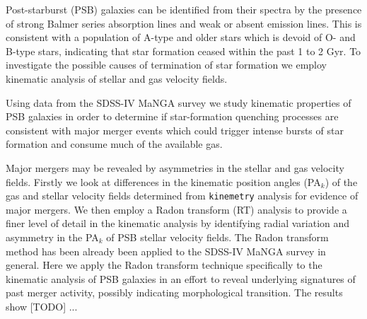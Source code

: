 
Post-starburst (PSB) galaxies can be identified from their spectra by the presence of strong Balmer series absorption lines and weak or absent emission lines. This is consistent with a population of A-type and older stars which is devoid of O- and B-type stars, indicating that star formation ceased within the past 1 to 2 Gyr. To investigate the possible causes of termination of star formation we employ kinematic analysis of stellar and gas velocity fields.

Using data from the SDSS-IV MaNGA survey we study  kinematic properties of PSB galaxies in order to determine if star-formation quenching processes are consistent with major merger events which could trigger intense bursts of star formation and  consume much of the available gas. 

Major mergers may be revealed by asymmetries in the stellar and gas velocity fields. Firstly we look at differences in the kinematic position angles (PA$_{k}$) of the gas and stellar velocity fields determined from \texttt{kinemetry} analysis for evidence of major mergers. We then employ a Radon transform (RT) analysis to provide a finer level of detail in the kinematic analysis by identifying radial variation and asymmetry in the PA$_{k}$ of PSB stellar velocity fields. The Radon transform method has been already been applied to the SDSS-IV MaNGA survey in general. Here we apply the Radon transform technique specifically to the kinematic analysis of PSB galaxies in an effort to reveal underlying signatures of past merger activity, possibly indicating morphological transition. The results show [TODO] ... 


